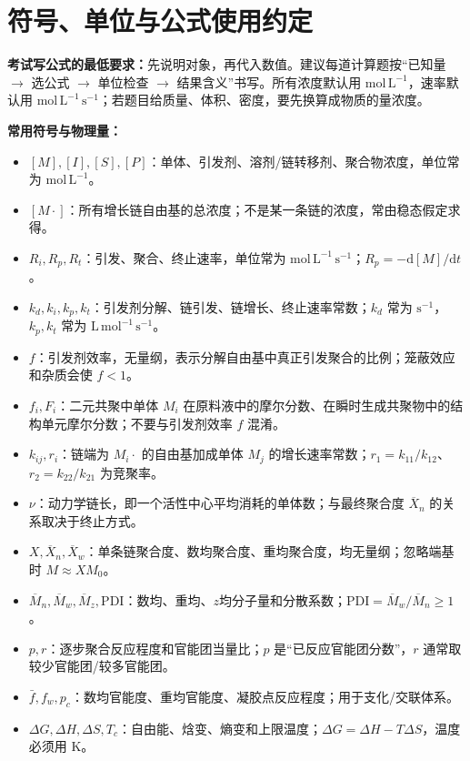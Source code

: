 \documentclass[UTF8,a4paper,10pt,twocolumn]{ctexart}
\newcommand{\Mn}{\overline{M}_n}
\newcommand{\Mw}{\overline{M}_w}
\newcommand{\Mz}{\overline{M}_z}
\newcommand{\Xn}{\overline{X}_n}
\newcommand{\Xw}{\overline{X}_w}
\newcommand{\PDI}{\mathrm{PDI}}
\newcommand{\dd}{\mathrm{d}}
\newcommand{\kp}{k_p}
\newcommand{\kt}{k_t}
\newcommand{\kd}{k_d}
\newcommand{\ki}{k_i}
\newcommand{\Rp}{R_p}
\newcommand{\Ri}{R_i}
\newcommand{\Rt}{R_t}
\begin{document}
\section{符号、单位与公式使用约定}
\begin{exam}
  \textbf{考试写公式的最低要求：}先说明对象，再代入数值。建议每道计算题按“已知量 $\to$ 选公式 $\to$ 单位检查 $\to$ 结果含义”书写。所有浓度默认用 $\mathrm{mol\,L^{-1}}$，速率默认用 $\mathrm{mol\,L^{-1}\,s^{-1}}$；若题目给质量、体积、密度，要先换算成物质的量浓度。
\end{exam}

\begin{exam}
  \textbf{常用符号与物理量：}
  \begin{itemize}
    \item $[M],[I],[S],[P]$：单体、引发剂、溶剂/链转移剂、聚合物浓度，单位常为 $\mathrm{mol\,L^{-1}}$。
    \item $[M\cdot]$：所有增长链自由基的总浓度；不是某一条链的浓度，常由稳态假定求得。
    \item $\Ri,\Rp,\Rt$：引发、聚合、终止速率，单位常为 $\mathrm{mol\,L^{-1}\,s^{-1}}$；$\Rp=-\dd[M]/\dd t$。
    \item $\kd,\ki,\kp,\kt$：引发剂分解、链引发、链增长、终止速率常数；$k_d$ 常为 $\mathrm{s^{-1}}$，$k_p,k_t$ 常为 $\mathrm{L\,mol^{-1}\,s^{-1}}$。
    \item $f$：引发剂效率，无量纲，表示分解自由基中真正引发聚合的比例；笼蔽效应和杂质会使 $f<1$。
    \item $f_i,F_i$：二元共聚中单体 $M_i$ 在原料液中的摩尔分数、在瞬时生成共聚物中的结构单元摩尔分数；不要与引发剂效率 $f$ 混淆。
    \item $k_{ij},r_i$：链端为 $M_i\cdot$ 的自由基加成单体 $M_j$ 的增长速率常数；$r_1=k_{11}/k_{12}$、$r_2=k_{22}/k_{21}$ 为竞聚率。
    \item $\nu$：动力学链长，即一个活性中心平均消耗的单体数；与最终聚合度 $\Xn$ 的关系取决于终止方式。
    \item $X,\Xn,\Xw$：单条链聚合度、数均聚合度、重均聚合度，均无量纲；忽略端基时 $M\approx XM_0$。
    \item $\Mn,\Mw,\Mz,\PDI$：数均、重均、$z$均分子量和分散系数；$\PDI=\Mw/\Mn\ge1$。
    \item $p,r$：逐步聚合反应程度和官能团当量比；$p$ 是“已反应官能团分数”，$r$ 通常取较少官能团/较多官能团。
    \item $\bar f,f_w,p_c$：数均官能度、重均官能度、凝胶点反应程度；用于支化/交联体系。
    \item $\Delta G,\Delta H,\Delta S,T_c$：自由能、焓变、熵变和上限温度；$\Delta G=\Delta H-T\Delta S$，温度必须用 K。
  \end{itemize}
\end{exam}
\end{document}
